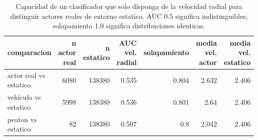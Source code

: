 \begin{table}[htbp]
  \centering
  \begin{tabular}{lrrrrrr}
    \toprule
    comparacion & n actor real & n estatico & AUC vel. radial & solapamiento & media vel. actor & media vel. estatico \\
    \midrule
    actor real vs estatico & 6080 & 138380 & 0.535 & 0.804 & 2.632 & 2.406 \\
    vehiculo vs estatico & 5998 & 138380 & 0.536 & 0.801 & 2.64 & 2.406 \\
    peaton vs estatico & 82 & 138380 & 0.507 & 0.8 & 2.042 & 2.406 \\
    \bottomrule
  \end{tabular}
  \caption{Capacidad de un clasificador que solo disponga de la velocidad radial para distinguir actores reales de entorno estatico. AUC 0.5 significa indistinguibles; solapamiento 1.0 significa distribuciones identicas.}
  \label{tab:separabilidad_radar}
\end{table}
